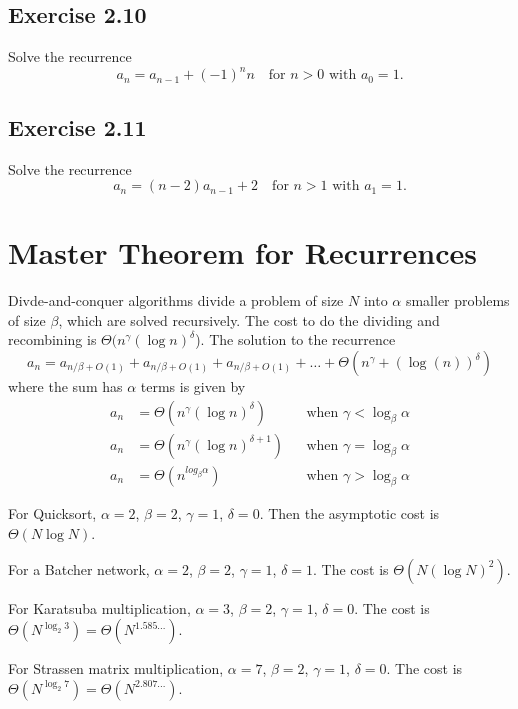 \documentclass[11pt, oneside]{article}   	%
\begin{document}
\subsection*{Exercise 2.10}
Solve the recurrence
\[
	a_n = a_{n-1} + (-1)^n n \quad \text{for $n>0$ with $a_0=1$.}
\]

\subsection*{Exercise 2.11}

Solve the recurrence
\[
	a_n = (n-2)a_{n-1} + 2 \quad \text{for $n>1$ with $a_1=1$.}
\]

\section{Master Theorem for Recurrences}
Divde-and-conquer algorithms divide a problem of size $N$ into $\alpha$ smaller problems of size $\beta$, which are solved recursively.
The cost to do the dividing and recombining is $\Theta(n^\gamma (\log n)^\delta$).
The solution to the recurrence
\[
	a_n = a_{n/\beta +O(1)} + a_{n/\beta+O(1)} + a_{n/\beta +O(1)} + \dots + \Theta(n^\gamma+(\log(n))^\delta)
\]
where the sum has $\alpha$ terms is given by
\begin{align}
	a_n &= \Theta(n^\gamma (\log n)^\delta)         &&\text{when } \gamma < \log_\beta \alpha \\
	a_n &=\Theta(n^\gamma (\log n)^{\delta+1})   &&\text{when } \gamma = \log_\beta \alpha \\
	a_n &=\Theta(n^{log_\beta \alpha})                   &&\text{when } \gamma > \log_\beta \alpha
\end{align}

For Quicksort, $\alpha=2$, $\beta=2$, $\gamma=1$, $\delta=0$. Then the asymptotic cost is $\Theta(N \log N)$.

For a Batcher network, $\alpha=2$, $\beta=2$, $\gamma=1$, $\delta=1$. The cost is $\Theta(N(\log N)^2)$.

For Karatsuba multiplication, $\alpha=3$, $\beta=2$, $\gamma=1$, $\delta=0$. The cost is $\Theta(N^{\log_2 3}) = \Theta(N^{1.585...})$.

For Strassen matrix multiplication, $\alpha=7$, $\beta=2$, $\gamma=1$, $\delta=0$. The cost is $\Theta(N^{\log_2 7}) = \Theta(N^{2.807...})$.
\end{document}
